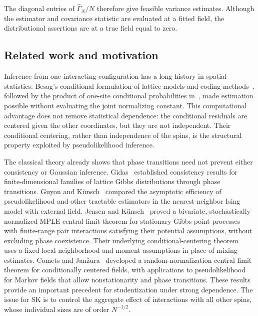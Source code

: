 \documentclass[11pt]{amsart}
\numberwithin{equation}{section}
\theoremstyle{remark}
\begin{document}
The diagonal entries of $\widehat\Gamma_N/N$ therefore give feasible variance estimates. Although the estimator and covariance statistic are evaluated at a fitted field, the distributional assertions are at a true field equal to zero.

\subsection{Related work and motivation}

Inference from one interacting configuration has a long history in spatial statistics. Besag's conditional formulation of lattice models and coding methods~\cite{Besag1974}, followed by the product of one-site conditional probabilities in~\cite[Section~3.3]{Besag1975}, made estimation possible without evaluating the joint normalizing constant. This computational advantage does not remove statistical dependence: the conditional residuals are centered given the other coordinates, but they are not independent. Their conditional centering, rather than independence of the spins, is the structural property exploited by pseudolikelihood inference.

The classical theory already shows that phase transitions need not prevent either consistency or Gaussian inference. Gidas~\cite{Gidas1988} established consistency results for finite-dimensional families of lattice Gibbs distributions through phase transitions. Guyon and K\"unsch~\cite{GuyonKuensch1992} compared the asymptotic efficiency of pseudolikelihood and other tractable estimators in the nearest-neighbor Ising model with external field. Jensen and K\"unsch~\cite[Theorem~1.1]{JensenKuensch1994} proved a bivariate, stochastically normalized MPLE central limit theorem for stationary Gibbs point processes with finite-range pair interactions satisfying their potential assumptions, without excluding phase coexistence. Their underlying conditional-centering theorem~\cite[Theorem~2.1]{JensenKuensch1994} uses a fixed local neighborhood and moment assumptions in place of mixing estimates. Comets and Jan\v{z}ura~\cite{CometsJanzura1998} developed a random-normalization central limit theorem for conditionally centered fields, with applications to pseudolikelihood for Markov fields that allow nonstationarity and phase transitions. These results provide an important precedent for studentization under strong dependence. The issue for SK is to control the aggregate effect of interactions with all other spins, whose individual sizes are of order $N^{-1/2}$.
\end{document}
